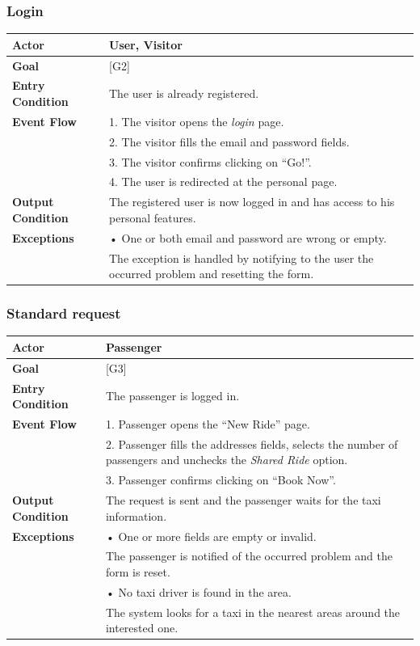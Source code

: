 \documentclass{article}
\begin{document}
\subsubsection{Login}
\begin{tabular}{| l | p{8cm} |}
\hline
\textbf{Actor}      &       User, Visitor \\
\hline
\textbf{Goal}       &       [G2]\\
\hline
\textbf{Entry Condition} &  The user is already registered.\\
\hline
\textbf{Event Flow}     &  1.	The visitor opens the \textit{login} page.\\&
                                            2.	The visitor fills the email and password fields.\\&
                                            3.  The visitor confirms clicking on “Go!”.\\&
                                            4.	The user is redirected at the personal page.
\\
\hline
\textbf{Output Condition} & The registered user is now logged in and has access to his personal features.\\
\hline
\textbf{Exceptions} &       •	One or both email and password are wrong or empty.\\&
                            The exception is handled by notifying to the user the occurred problem and resetting the form.
\\
\hline
\end{tabular} 


\subsubsection{Standard request}
\begin{tabular}{| l | p{8cm} |}
\hline
\textbf{Actor}      &       Passenger \\
\hline
\textbf{Goal}       &       [G3]\\
\hline
\textbf{Entry Condition} &  The passenger is logged in.\\
\hline
\textbf{Event Flow}     &  1.	Passenger opens the “New Ride” page.\\&
                                            2.	Passenger fills the addresses fields, selects the number of passengers and unchecks the \textit{Shared Ride} option.\\&
                                            3.	Passenger confirms clicking on “Book Now”.\\
\hline
\textbf{Output Condition} & The request is sent and the passenger waits for the taxi information.\\
\hline
\textbf{Exceptions} &       •	One or more fields are empty or invalid.\\&

The passenger is notified of the occurred problem and the form is reset.\\&
• No taxi driver is found in the area.\\&
The system looks for a taxi in the nearest areas around the interested one.\\
\hline
\end{tabular} 
\end{document}

